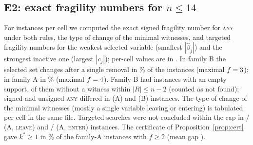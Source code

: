 \documentclass[10pt,a4paper]{article}
\theoremstyle{plain}
\theoremstyle{definition}
\theoremstyle{remark}
\newcommand{\tsc}[1]{\textnormal{\textsc{#1}}}  %
\begin{document}
\subsection{E2: exact fragility numbers for \texorpdfstring{$n\le14$}{n <= 14}}
For \EtwoReps{} instances per cell we computed the exact signed fragility number for \tsc{any} under both rules, the type of change of the minimal witnesses, and targeted fragility numbers for the weakest selected variable (smallest $|\hat\beta_j|$) and the strongest inactive one (largest $|c_j|$); per-cell values are in . In family B the selected set changes after a single removal in \EtwoBFracOne\% of the \EtwoBN{} instances (maximal $f=3$); in family A in \EtwoAFracOne\% (maximal $f=4$). Family B had \EtwoBEmptySupport{} instances with an empty support, \EtwoBNotFound{} of them without a witness within $|R|\le n-2$ (counted as not found); signed and unsigned \tsc{any} differed in \EtwoASignedNeUnsignedCount{} (A) and \EtwoBSignedNeUnsignedCount{} (B) instances. The type of change of the minimal witnesses (mostly a single variable leaving or entering) is tabulated per cell in the same file. Targeted searches were not concluded within the cap in \EtwoALeaveNotFound/\EtwoALeaveN{} (A, \tsc{leave}) and \EtwoAEnterNotFound/\EtwoAEnterN{} (A, \tsc{enter}) instances. The certificate of Proposition~\ref{prop:cert} gave $k^\ast\ge1$ in \EtwoAKstarGeOne\% of the \EtwoANGeTwo{} family-A instances with $f\ge2$ (mean gap \EtwoAKstarGap).
\end{document}
